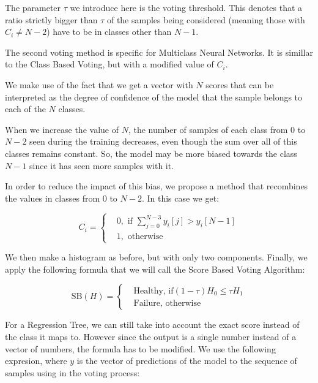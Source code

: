 The parameter $\tau$ we introduce here is the voting threshold.
This denotes that a ratio strictly bigger than $\tau$ of the samples being considered (meaning those with $C_i \neq N-2$) have to be in classes other than $N-1$.

The second voting method is specific for Multiclass Neural Networks.
It is simillar to the Class Based Voting, but with a modified value of $C_i$.

We make use of the fact that we get a vector with $N$ scores that can be interpreted as the degree of confidence of the model that the sample belongs to each of the $N$ classes.

When we increase the value of $N$, the number of samples of each class from $0$ to $N-2$ seen during the training decreases, even though the sum over all of this classes remains constant.
So, the model may be more biased towards the class $N-1$ since it has seen more samples with it.

In order to reduce the impact of this bias, we propose a method that recombines the values in classes from $0$ to $N-2$.
In this case we get:

\begin{equation}\label{eq:modified_class}
  C_i = 
  \begin{cases}
    & 0, \text{ if } \sum_{j=0}^{N-3} y_i[j] > y_i[N-1] \\
    & 1, \text{ otherwise}
  \end{cases}
\end{equation}

We then make a histogram as before, but with only two components.
Finally, we apply the following formula that we will call the Score Based Voting Algorithm:

\begin{equation}\label{eq:score_based_voting}
  \text{SB}(H) = 
    \begin{cases}
        & \text{Healthy, if} (1-\tau)H_0 \leq \tau H_1 \\
        & \text{Failure, otherwise} 
  \end{cases}
\end{equation}

For a Regression Tree, we can still take into account the exact score instead of the class it maps to.
However since the output is a single number instead of a vector of numbers, the formula has to be modified.
We use the following expresion, where $y$ is the vector of predictions of the model to the sequence of samples using in the voting process:

